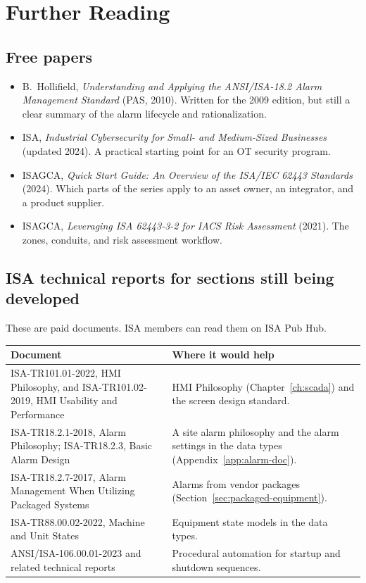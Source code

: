 \section[Further Reading]{Further Reading \newmark}\label{sec:further-reading}
\subsection*{Free papers}
\begin{itemize}[itemsep=1pt]
  \item B.~Hollifield, \emph{Understanding and Applying the ANSI/ISA-18.2 Alarm Management Standard} (PAS, 2010). Written for the 2009 edition, but still a clear summary of the alarm lifecycle and rationalization.
  \item ISA, \emph{Industrial Cybersecurity for Small- and Medium-Sized Businesses} (updated 2024). A practical starting point for an OT security program.
  \item ISAGCA, \emph{Quick Start Guide: An Overview of the ISA/IEC 62443 Standards} (2024). Which parts of the series apply to an asset owner, an integrator, and a product supplier.
  \item ISAGCA, \emph{Leveraging ISA 62443-3-2 for IACS Risk Assessment} (2021). The zones, conduits, and risk assessment workflow.
\end{itemize}

\subsection*{ISA technical reports for sections still being developed}
These are paid documents. ISA members can read them on ISA Pub Hub.
\begin{small}
\begin{longtable}{@{}P{7.20cm}P{9.73cm}@{}}
\toprule
{}\textbf{Document} & \textbf{Where it would help} \\
\midrule
\endhead
ISA-TR101.01-2022, HMI Philosophy, and ISA-TR101.02-2019, HMI Usability and Performance & HMI Philosophy (Chapter~\ref{ch:scada}) and the screen design standard. \\
ISA-TR18.2.1-2018, Alarm Philosophy; ISA-TR18.2.3, Basic Alarm Design & A site alarm philosophy and the alarm settings in the data types (Appendix~\ref{app:alarm-doc}). \\
ISA-TR18.2.7-2017, Alarm Management When Utilizing Packaged Systems & Alarms from vendor packages (Section~\ref{sec:packaged-equipment}). \\
ISA-TR88.00.02-2022, Machine and Unit States & Equipment state models in the data types. \\
ANSI/ISA-106.00.01-2023 and related technical reports & Procedural automation for startup and shutdown sequences. \\
\bottomrule
\end{longtable}
\end{small}

